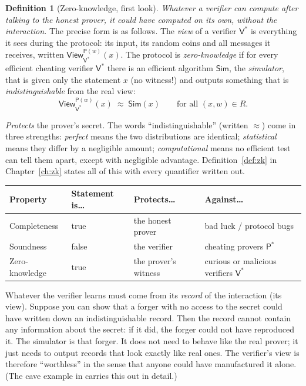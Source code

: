 \documentclass[11pt,a4paper]{report}
\theoremstyle{plain}
\theoremstyle{definition}
\newtheorem{definition}[theorem]{Definition}
\theoremstyle{remark}
\newcommand{\Prv}{\mathsf{P}}\newcommand{\Ver}{\mathsf{V}}
\newcommand{\Sim}{\mathsf{Sim}}\newcommand{\Ext}{\mathsf{Ext}}
\newcommand{\view}{\mathsf{View}}
\begin{document}
\begin{definition}[Zero-knowledge, first look]\label{def:intro-zk}
\emph{Whatever a verifier can compute after talking to the honest prover, it could have computed on its own, without the interaction.}
The precise form is as follows. The \emph{view} of a verifier $\Ver^*$ is everything it sees during the protocol: its input, its random coins and all messages it receives,
written $\view_{\Ver^*}^{\Prv(w)}(x)$. The protocol is \emph{zero-knowledge} if for every efficient cheating verifier $\Ver^*$ there is an efficient algorithm $\Sim$, the \emph{simulator}, that is given only the statement $x$ (no witness!) and outputs something that is \emph{indistinguishable} from the real view:
\[
 \view_{\Ver^*}^{\Prv(w)}(x)\;\approx\;\Sim(x)\qquad\text{for all }(x,w)\in R .
\]
\end{definition}
\emph{Protects} the prover's secret. The words ``indistinguishable'' (written $\approx$) come in three strengths:
\emph{perfect} means the two distributions are identical; \emph{statistical} means they differ by a negligible amount; \emph{computational} means no efficient test can tell them apart, except with negligible advantage. Definition~\ref{def:zk} in Chapter~\ref{ch:zk} states all of this with every quantifier written out.

\medskip
\begin{center}
\renewcommand{\arraystretch}{1.3}
\begin{tabular}{@{}L{2.6cm} L{3.8cm} L{3.8cm} L{3.6cm}@{}}
\toprule
\textbf{Property} & \textbf{Statement is\ldots} & \textbf{Protects\ldots} & \textbf{Against\ldots}\\
\midrule
Completeness & true & the honest prover & bad luck / protocol bugs\\
Soundness & false & the verifier & cheating provers $\Prv^*$\\
Zero-knowledge & true & the prover's witness & curious or malicious verifiers $\Ver^*$\\
\bottomrule
\end{tabular}
\end{center}

\begin{intuition}
Whatever the verifier learns must come from its \emph{record} of the interaction (its view). Suppose you can show that a forger with no access to the secret could have written down an indistinguishable record. Then the record cannot contain any information about the secret: if it did, the forger could not have reproduced it.
The simulator is that forger. It does not need to behave like the real prover; it just needs to output records that look exactly like real ones. The verifier's view is therefore ``worthless'' in the sense that anyone could have manufactured it alone. (The cave example in  carries this out in detail.)
\end{intuition}
\end{document}
